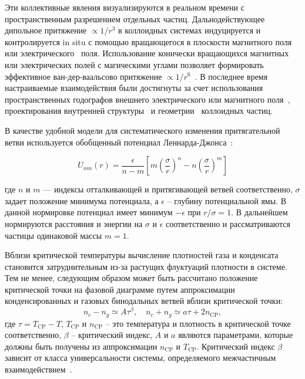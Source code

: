 Эти коллективные явления визуализируются в реальном времени с пространственным разрешением отдельных частиц.
Дальнодействующее дипольное притяжение $\propto 1/r^3$ в коллоидных системах индуцируется и контролируется in situ с помощью вращающегося в плоскости магнитного поля~\cite{10.1088/0034-4885/76/12/126601, 10.1039/c3sm50306b, 10.1039/c3sm27620a, 10.1103/physrevmaterials.2.025602} или электрического~\cite{10.1088/1367-2630/8/11/267, 10.1063/1.3115641, 10.1021/la2014804, 10.1021/la500178b, 10.1039/c1sm06414b, 10.1038/s41598-017-14001-y} поля.
Использование конически вращающихся магнитных или электрических полей с магическими углами позволяет формировать эффективное ван-дер-ваальсово притяжение $\propto 1/r^6$~\cite{10.1021/la500896e, 10.1103/physrevlett.103.228301}.
В последнее время настраиваемые взаимодействия были достигнуты за счет использования пространственных годографов внешнего электрического или магнитного поля~\cite{10.1039/d0sm01046d}, проектирования внутренней структуры~\cite{10.1063/5.0055566} и геометрии~\cite{10.1063/5.0060705} коллоидных частиц.

В качестве удобной модели для систематического изменения притягательной ветви используется обобщенный потенциал Леннарда-Джонса~\cite{10.1063/5.0075479}:

\begin{equation}
  U_{n m}(r)=\frac{\epsilon}{n-m}\left[m\left(\frac{\sigma}{r}\right)^{n}-n\left(\frac{\sigma}{r}\right)^{m}\right]
  \label{LJnm}
\end{equation}

где $n$ и $m$ — индексы отталкивающей и притягивающей ветвей соответственно, $\sigma$ задает положение минимума потенциала, а $\epsilon$ -- глубину потенциальной ямы.
В данной нормировке потенциал имеет минимум $-\epsilon$ при $r/\sigma=1$.
В дальнейшем нормируются расстояния и энергии на $\sigma$ и $\epsilon$ соответственно и рассматриваются частицы одинаковой массы $m=1$.

Вблизи критической температуры вычисление плотностей газа и конденсата становится затруднительным из-за растущих флуктуаций плотности в системе.
Тем не менее, следующим образом может быть рассчитано положение критической точки на фазовой диаграмме путем аппроксимации конденсированных и газовых бинодальных ветвей вблизи критической точки:
\begin{equation}
  n_{c}-n_{g} \simeq A \tau^{\beta}, \quad n_{c}+n_{g} \simeq a \tau+2 n_{\mathrm{CP}},
  \label{MACR-eq4}
\end{equation}
где $\tau=T_{\mathrm{CP}}-T$, $T_{\mathrm{CP}}$ и $n_{\mathrm{CP}}$ -- это температура и
плотность в критической точке соответственно, $\beta$ -- критический индекс, $A$ и $a$ являются параметрами, которые должны быть получены из аппроксимации $n_{\mathrm{CP}}$ и $T_{\mathrm{CP}}$.
Критический индекс $\beta$ зависит от класса универсальности системы, определяемого межчастичным взаимодействием~\cite{10.1103/physrevlett.89.025703}.

